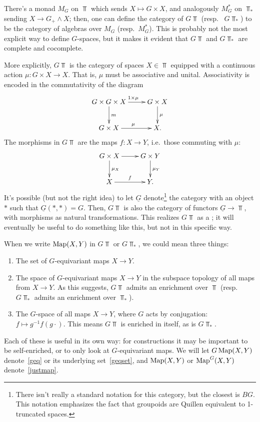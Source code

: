 There's a monad $M_G$ on $\Top$ which sends $X\mapsto G\times X$, and analogously $M_G^*$ on $\Top_*$ sending $X\to
G_+\land X$; then, one can define the category of  $G\Top$ (resp.\ 
$G\Top_*$) to be the category of algebras over $M_G$ (resp.\ $M_G^*$). This is probably not the most explicit way
to define $G$-spaces, but it makes it evident that $G\Top$ and $G\Top_*$ are complete and cocomplete.

More explicitly, $G\Top$ is the category of spaces $X\in\Top$ equipped with a continuous action $\mu\colon G\times
X\to X$. That is, $\mu$ must be associative and unital. Associativity is encoded in the commutativity of the
diagram
\[\xymatrix{
	G\times G\times X\ar[r]^{1\times\mu}\ar[d]^m & G\times X\ar[d]^\mu\\
	G\times X\ar[r]^\mu & X.
}\]
The morphisms in $G\Top$ are the  maps $f\colon X\to Y$, i.e.\ those commuting with $\mu$:
\[\xymatrix{
	G\times X\ar[r]\ar[d]^{\mu_X} & G\times Y\ar[d]^{\mu_Y}\\
	X\ar[r]^f & Y.
}\]
It's possible (but not the right idea) to let $\underline G$ denote\footnote{There isn't really a standard notation for this category, but the closest is $BG$. This notation emphasizes the fact that groupoids are Quillen equivalent to 1-truncated spaces.} the category with an object $*$ such that
$\underline G(*, *) = G$. Then, $G\Top$ is also the category of functors $\underline G\to\Top$, with morphisms as
natural transformations. This realizes $G\Top$ as a ; it will eventually be useful to do
something like this, but not in this specific way.

When we write $\operatorname{Map}(X, Y)$ in $G\Top$ or $G\Top_*$, we could mean three things:
\begin{enumerate}
	\item\label{geqset} The set of $G$-equivariant maps $X\to Y$.
	\item\label{geq} The space of $G$-equivariant maps $X\to Y$ in the subspace topology of all maps from $X\to Y$.
	As this suggests, $G\Top$ admits an enrichment over $\Top$ (resp.\ $G\Top_*$ admits an enrichment over
	$\Top_*$).
	\item\label{justmap} The $G$-space of all maps $X\to Y$, where $G$ acts by conjugation: $f\mapsto
	g^{-1}f(g\cdot)$. This means $G\Top$ is enriched in itself, as is $G\Top_*$.
\end{enumerate}
Each of these is useful in its own way: for constructions it may be important to be self-enriched, or to only look
at $G$-equivariant maps. We will let $G\operatorname{Map}(X,Y)$ denote~\eqref{geq} or its underlying set~\eqref{geqset}, and
$\operatorname{Map}(X,Y)$ or $\operatorname{Map}^G(X,Y)$ denote~\eqref{justmap}.

